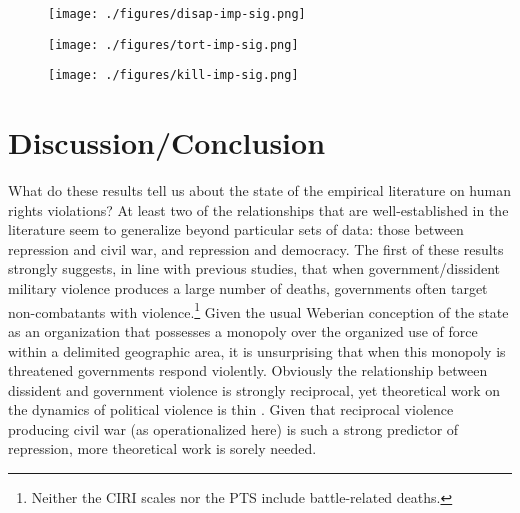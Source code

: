 \documentclass[12pt]{article}
\begin{document}
\begin{figure}[!htpb]
\centering
\texttt{[image: ./figures/disap-imp-sig.png]}
\caption{}
\label{disap-imp}
\end{figure}

\begin{figure}[!htpb]
\centering
\texttt{[image: ./figures/tort-imp-sig.png]}
\caption{}
\label{tort-imp}
\end{figure}

\begin{figure}[!htpb]
\centering
\texttt{[image: ./figures/kill-imp-sig.png]}
\caption{}
\label{kill-imp}
\end{figure}

\section{Discussion/Conclusion}

What do these results tell us about the state of the empirical literature on human rights violations? At least two of the relationships that are well-established in the literature seem to generalize beyond particular sets of data: those between repression and civil war, and repression and democracy. The first of these results strongly suggests, in line with previous studies, that when government/dissident military violence produces a large number of deaths, governments often target non-combatants with violence.\footnote{Neither the CIRI scales nor the PTS include battle-related deaths.} Given the usual Weberian conception of the state as an organization that possesses a monopoly over the organized use of force within a delimited geographic area, it is unsurprising that when this monopoly is threatened governments respond violently. Obviously the relationship between dissident and government violence is strongly reciprocal, yet theoretical work on the dynamics of political violence is thin \citep[But see, e.g.][]{Moore2000,Pierskalla2010,RitterJCR}. Given that reciprocal violence producing civil war (as operationalized here) is such a strong predictor of repression, more theoretical work is sorely needed. 
\end{document}
